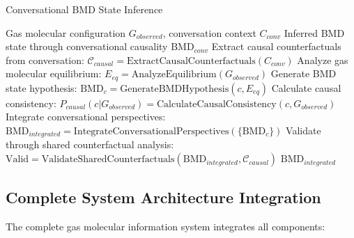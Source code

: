 \documentclass[11pt,a4paper]{article}
\begin{document}
\begin{algorithm}
\caption{Conversational BMD State Inference}
\begin{algorithmic}[1]
\REQUIRE Gas molecular configuration $G_{observed}$, conversation context $C_{conv}$
\ENSURE Inferred BMD state through conversational causality $\text{BMD}_{conv}$
\STATE Extract causal counterfactuals from conversation: $\mathcal{C}_{causal} = \text{ExtractCausalCounterfactuals}(C_{conv})$
\STATE Analyze gas molecular equilibrium: $E_{eq} = \text{AnalyzeEquilibrium}(G_{observed})$
    \STATE Generate BMD state hypothesis: $\text{BMD}_c = \text{GenerateBMDHypothesis}(c, E_{eq})$
    \STATE Calculate causal consistency: $P_{causal}(c | G_{observed}) = \text{CalculateCausalConsistency}(c, G_{observed})$
\ENDFOR
\STATE Integrate conversational perspectives: $\text{BMD}_{integrated} = \text{IntegrateConversationalPerspectives}(\{\text{BMD}_c\})$
\STATE Validate through shared counterfactual analysis: $\text{Valid} = \text{ValidateSharedCounterfactuals}(\text{BMD}_{integrated}, \mathcal{C}_{causal})$
\RETURN $\text{BMD}_{integrated}$
\end{algorithmic}
\end{algorithm}

\subsection{Complete System Architecture Integration}

The complete gas molecular information system integrates all components:
\end{document}
